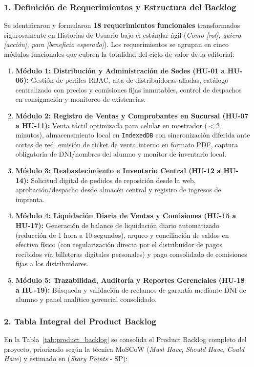 \subsubsection*{\color{mauve} 1. Definición de Requerimientos y Estructura del Backlog}
\noindent Se identificaron y formularon \textbf{18 requerimientos funcionales} transformados rigurosamente en Historias de Usuario bajo el estándar ágil (\textit{Como [rol], quiero [acción], para [beneficio esperado]}). Los requerimientos se agrupan en cinco módulos funcionales que cubren la totalidad del ciclo de valor de la editorial:
\begin{enumerate}
    \item \textbf{Módulo 1: Distribución y Administración de Sedes (HU-01 a HU-06):} Gestión de perfiles RBAC, alta de distribuidoras aliadas, catálogo centralizado con precios y comisiones fijas inmutables, control de despachos en consignación y monitoreo de existencias.
    \item \textbf{Módulo 2: Registro de Ventas y Comprobantes en Sucursal (HU-07 a HU-11):} Venta táctil optimizada para celular en mostrador ($< 2$ minutos), almacenamiento local en \texttt{IndexedDB} con sincronización diferida ante cortes de red, emisión de ticket de venta interno en formato PDF, captura obligatoria de DNI/nombres del alumno y monitor de inventario local.
    \item \textbf{Módulo 3: Reabastecimiento e Inventario Central (HU-12 a HU-14):} Solicitud digital de pedidos de reposición desde la web, aprobación/despacho desde almacén central y registro de ingresos de imprenta.
    \item \textbf{Módulo 4: Liquidación Diaria de Ventas y Comisiones (HU-15 a HU-17):} Generación de balance de liquidación diario automatizado (reducción de 1 hora a 10 segundos), arqueo y conciliación de saldos en efectivo físico (con regularización directa por el distribuidor de pagos recibidos vía billeteras digitales personales) y pago consolidado de comisiones fijas a los distribuidores.
    \item \textbf{Módulo 5: Trazabilidad, Auditoría y Reportes Gerenciales (HU-18 a HU-19):} Búsqueda y validación de reclamos de garantía mediante DNI de alumno y panel analítico gerencial consolidado.
\end{enumerate}

\subsubsection*{\color{mauve} 2. Tabla Integral del Product Backlog}
\noindent En la Tabla~\ref{tab:product_backlog} se consolida el Product Backlog completo del proyecto, priorizado según la técnica MoSCoW (\textit{Must Have}, \textit{Should Have}, \textit{Could Have}) y estimado en (\textit{Story Points} - SP):

